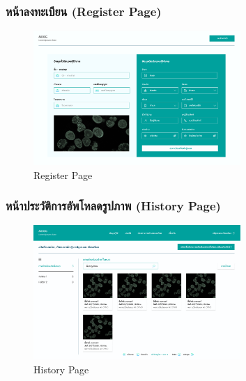 \newpage
\subsubsection{หน้าลงทะเบียน (Register Page)}
\begin{figure}[h]
    \begin{center}
        \includegraphics[width=0.7\textwidth]{img/user/2-register-page.png}
    \end{center}
    \caption[Poem]{Register Page}
    \label{fig:register}
\end{figure}

\subsubsection{หน้าประวัติการอัพโหลดรูปภาพ (History Page)}
\begin{figure}[h]
    \begin{center}
        \includegraphics[width=0.7\textwidth]{img/user/3-1-histort-page.png}
    \end{center}
    \caption[Poem]{History Page}
    \label{fig:history}
\end{figure}

